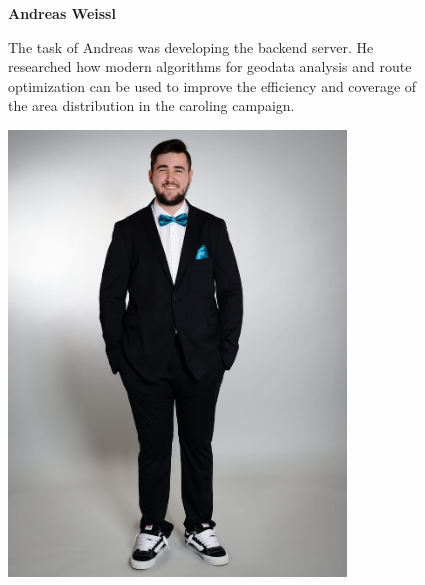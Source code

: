     \begin{figure}[H]
        \centering
        \begin{minipage}{0.6\textwidth}
          \setlength{\baselineskip}{1.5em}
          \vspace{-1em}
          \textbf{Andreas Weissl}

          The task of Andreas was developing the backend server. He researched how modern algorithms for geodata analysis and route optimization can be used to improve the efficiency and coverage of the area distribution in the caroling campaign.
        \end{minipage}
        \hfill
        \begin{minipage}{0.35\textwidth}
            \center
            \includegraphics[width=0.8\textwidth]{images/people/andreasWeissl.jpeg}
    \end{minipage}
    \end{figure}

\newpage